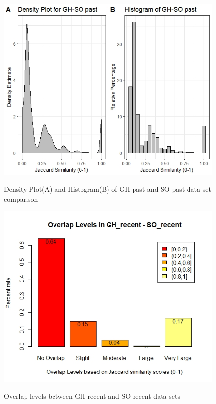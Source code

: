         \begin{figure}
          \centering
          \includegraphics[width=\textwidth]{figures/GH_SO_past.jpeg}\\
          \caption{Density Plot(A) and Histogram(B) of GH-past and SO-past data set comparison}
          \label{fig:GH_SO_past}
        \end{figure}
        
        
        \begin{figure}
          \centering
          \includegraphics[width=\textwidth]{figures/overlap_GH_SO_recent.jpeg}\\
          \caption{Overlap levels between GH-recent and SO-recent data sets}
          \label{fig:overlap_GH_SO_recent}
        \end{figure}
        
